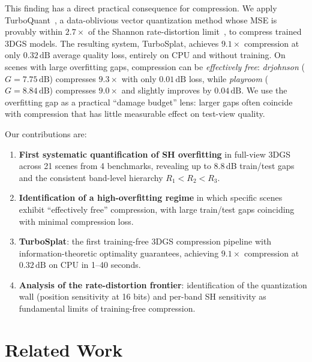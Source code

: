 \documentclass[sigconf,review]{acmart}
\newcommand{\ours}{TurboSplat}
\newcommand{\dB}{\,\text{dB}}
\newcommand{\R}[1]{R_{#1}}
\begin{document}
This finding has a direct practical consequence for compression.
We apply TurboQuant~\cite{zandieh2025turboquant}, a data-oblivious vector quantization method whose MSE is provably within $2.7{\times}$ of the Shannon rate-distortion limit~\cite{shannon1948}, to compress trained 3DGS models.
The resulting system, \ours{}, achieves $9.1{\times}$ compression at only $0.32\dB$ average quality loss, entirely on CPU and without training.
On scenes with large overfitting gaps, compression can be \emph{effectively free}: \textit{drjohnson} ($G{=}7.75\dB$) compresses $9.3{\times}$ with only $0.01\dB$ loss, while \textit{playroom} ($G{=}8.84\dB$) compresses $9.0{\times}$ and slightly improves by $0.04\dB$.
We use the overfitting gap as a practical ``damage budget'' lens: larger gaps often coincide with compression that has little measurable effect on test-view quality.

Our contributions are:
\begin{enumerate}
\item \textbf{First systematic quantification of SH overfitting} in full-view 3DGS across 21 scenes from 4 benchmarks, revealing up to 8.8\,dB train/test gaps and the consistent band-level hierarchy $\R{1} < \R{2} < \R{3}$.
\item \textbf{Identification of a high-overfitting regime} in which specific scenes exhibit ``effectively free'' compression, with large train/test gaps coinciding with minimal compression loss.
\item \textbf{\ours{}}: the first training-free 3DGS compression pipeline with information-theoretic optimality guarantees, achieving $9.1{\times}$ compression at $0.32\dB$ on CPU in 1--40 seconds.
\item \textbf{Analysis of the rate-distortion frontier}: identification of the quantization wall (position sensitivity at 16 bits) and per-band SH sensitivity as fundamental limits of training-free compression.
\end{enumerate}

\section{Related Work}
\label{sec:related}
\end{document}
